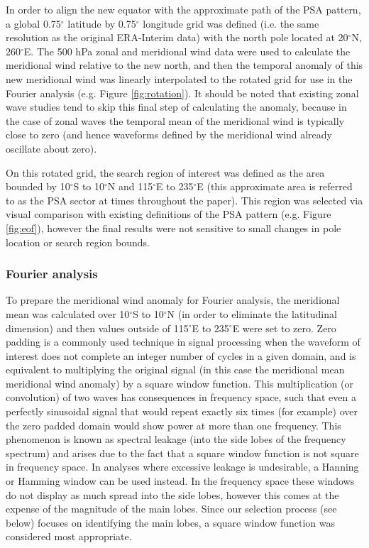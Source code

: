 In order to align the new equator with the approximate path of the PSA pattern, a global 0.75$^{\circ}$ latitude by 0.75$^{\circ}$ longitude grid was defined (i.e. the same resolution as the original ERA-Interim data) with the north pole located at 20$^{\circ}$N, 260$^{\circ}$E. The 500 hPa zonal and meridional wind data were used to calculate the meridional wind relative to the new north, and then the temporal anomaly of this new meridional wind was linearly interpolated to the rotated grid for use in the Fourier analysis (e.g. Figure \ref{fig:rotation}). It should be noted that existing zonal wave studies \citep[e.g.][]{IrvingSimmonds2015} tend to skip this final step of calculating the anomaly, because in the case of zonal waves the temporal mean of the meridional wind is typically close to zero (and hence waveforms defined by the meridional wind already oscillate about zero). 

On this rotated grid, the search region of interest was defined as the area bounded by 10$^{\circ}$S to 10$^{\circ}$N and 115$^{\circ}$E to 235$^{\circ}$E (this approximate area is referred to as the PSA sector at times throughout the paper). This region was selected via visual comparison with existing definitions of the PSA pattern (e.g. Figure \ref{fig:eof}), however the final results were not sensitive to small changes in pole location or search region bounds.

\subsubsection{Fourier analysis}

To prepare the meridional wind anomaly for Fourier analysis, the meridional mean was calculated over 10$^{\circ}$S to 10$^{\circ}$N (in order to eliminate the latitudinal dimension) and then values outside of 115$^{\circ}$E to 235$^{\circ}$E were set to zero. Zero padding is a commonly used technique in signal processing when the waveform of interest does not complete an integer number of cycles in a given domain, and is equivalent to multiplying the original signal (in this case the meridional mean meridional wind anomaly) by a square window function. This multiplication (or convolution) of two waves has consequences in frequency space, such that even a perfectly sinusoidal signal that would repeat exactly six times (for example) over the zero padded domain would show power at more than one frequency. This phenomenon is known as spectral leakage (into the side lobes of the frequency spectrum) and arises due to the fact that a square window function is not square in frequency space. In analyses where excessive leakage is undesirable, a Hanning or Hamming window can be used instead. In the frequency space these windows do not display as much spread into the side lobes, however this comes at the expense of the magnitude of the main lobes. Since our selection process (see below) focuses on identifying the main lobes, a square window function was considered most appropriate.

